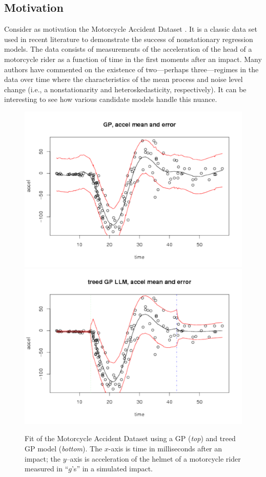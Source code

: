 \subsection*{Motivation}

Consider as motivation the Motorcycle Accident Dataset
\cite{silv:1985}.  It is a classic data set used in recent literature
\cite{rasm:ghah:nips:2002} to demonstrate the success of nonstationary
regression models.  The data consists of measurements of the
acceleration of the head of a motorcycle rider as a function of time
in the first moments after an impact.  Many authors have commented on
the existence of two---perhaps three---regimes in the data over time
where the characteristics of the mean process and noise level change
(i.e., a nonstationarity and heteroskedasticity, respectively).  It
can be interesting to see how various candidate models handle this
nuance.

\begin{figure}[ht!]
\centering
\includegraphics[trim=0 25 0 0]{motovate_bgp}
\includegraphics[trim=0 25 0 0]{motovate_btgp}
\caption{Fit of the Motorcycle Accident Dataset using a GP ({\em top})
  and treed GP model ({\em bottom}).  The $x$-axis is time in
  milliseconds after an impact; the $y$--axis is acceleration of the
  helmet of a motorcycle rider measured in ``$g$'s'' in a simulated
  impact.}
\label{f:motivate}
\end{figure}

